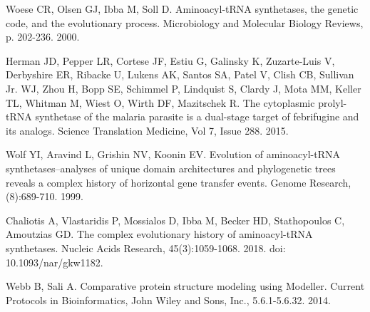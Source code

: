 \documentclass[10pt,letterpaper]{article}
\begin{document}
%
%
% 
\begin{thebibliography}{10}



Woese CR, Olsen GJ, Ibba M, Soll D.
\newblock Aminoacyl-tRNA synthetases, the genetic code, and the evolutionary process.
\newblock Microbiology and Molecular Biology Reviews, p. 202-236. 2000.

Herman JD, Pepper LR, Cortese JF, Estiu G, Galinsky K, Zuzarte-Luis V, Derbyshire ER, Ribacke U, Lukens AK, Santos SA, Patel V, Clish CB, Sullivan Jr. WJ, Zhou H,
Bopp SE, Schimmel P, Lindquist S, Clardy J, Mota MM, Keller TL, Whitman M, Wiest O, Wirth DF, Mazitschek R. 
\newblock The cytoplasmic prolyl-tRNA synthetase of the malaria parasite is a dual-stage target of febrifugine and its analogs.
\newblock Science Translation Medicine, Vol 7, Issue 288. 2015.

Wolf YI, Aravind L, Grishin NV, Koonin EV.
\newblock Evolution of aminoacyl-tRNA synthetases--analyses of unique domain architectures and phylogenetic trees reveals a complex history of horizontal gene transfer events.
\newblock Genome Research, (8):689-710. 1999.

Chaliotis A, Vlastaridis P, Mossialos D, Ibba M, Becker HD, Stathopoulos C, Amoutzias GD.
\newblock The complex evolutionary history of aminoacyl-tRNA synthetases.
\newblock Nucleic Acids Research, 45(3):1059-1068. 2018. doi: 10.1093/nar/gkw1182.

Webb B, Sali A.
\newblock Comparative protein structure modeling using Modeller.
\newblock Current Protocols in Bioinformatics, John Wiley and Sons, Inc., 5.6.1-5.6.32. 2014.


\end{thebibliography}
\end{document}
